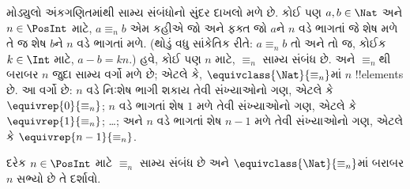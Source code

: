 \documentclass[../../../include/open-logic-section]{subfiles}
\begin{document}
\begin{ex}
મોડ્યુલો અંકગણિતમાંથી સામ્ય સંબંધોનો સુંદર દાખલો મળે છે.
કોઈ પણ $a,b\in\Nat$ અને $n \in \PosInt$ માટે,
$a \equiv_n b$ એમ કહીએ જો અને ફક્ત જો $a$ને $n$ વડે
ભાગતાં જે શેષ મળે તે જ શેષ $b$ને $n$ વડે ભાગતાં મળે.
(થોડું વધુ સાંકેતિક રીતે: $a \equiv_n b$ તો અને તો જ,
કોઈક $k \in \Int$ માટે, $a - b = kn$.)
હવે, કોઈ પણ $n$ માટે, $\equiv_n$ સામ્ય સંબંધ છે.
અને $\equiv_n$થી બરાબર $n$ જુદા સામ્ય વર્ગો મળે છે;
એટલે કે, $\equivclass{\Nat}{\equiv_n}$માં $n$ !!{element}s છે.
આ વર્ગો છે: $n$ વડે નિઃશેષ ભાગી શકાય તેવી સંખ્યાઓનો ગણ,
એટલે કે $\equivrep{0}{\equiv_n}$; $n$ વડે ભાગતાં
શેષ $1$ મળે તેવી સંખ્યાઓનો ગણ, એટલે કે
$\equivrep{1}{\equiv_n}$; \ldots; અને $n$ વડે ભાગતાં
શેષ $n-1$ મળે તેવી સંખ્યાઓનો ગણ, એટલે કે
$\equivrep{n-1}{\equiv_n}$.
\end{ex}

\begin{prob}
દરેક $n \in \PosInt$ માટે $\equiv_n$ સામ્ય સંબંધ છે અને
$\equivclass{\Nat}{\equiv_n}$માં બરાબર $n$ સભ્યો છે તે દર્શાવો.
\end{prob}
\end{document}
